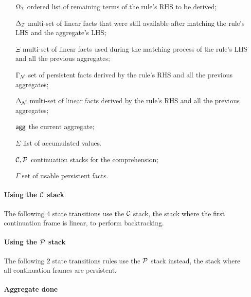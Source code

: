 \begin{enumerate}

   \item[$\Omega_{\mathcal{I}}$] ordered list of remaining terms of the rule's RHS to be
      derived;

   \item[$\Delta_{\mathcal{I}}$] multi-set of linear facts that were still available after
   matching the rule's LHS and the aggregate's LHS;
   \item[$\Xi$] multi-set of linear facts used during the matching process of
   the rule's LHS and all the previous aggregates;

   \item[$\Gamma_{\mathcal{N}}$] set of persistent facts derived by the rule's RHS and all
      the previous aggregates;

   \item[$\Delta_{\mathcal{N}}$] multi-set of linear facts derived by the rule's RHS and
      all the previous aggregates;

   \item[$\mathsf{agg}$] the current aggregate;
   \item[$\Sigma$] list of accumulated values.
   \item[$\mathcal{C}, \mathcal{P}$] continuation stacks for the comprehension;
   \item[$\Gamma$] set of usable persistent facts.
\end{enumerate}

\paragraph{Using the $\mathcal{C}$ stack}

The following 4 state transitions use the $\mathcal{C}$ stack, the stack where the
first continuation frame is linear, to perform backtracking.



\paragraph{Using the $\mathcal{P}$ stack}

The following 2 state transitions rules use the $\mathcal{P}$ stack instead, the stack where all
continuation frames are persistent.



\paragraph{Aggregate done}

